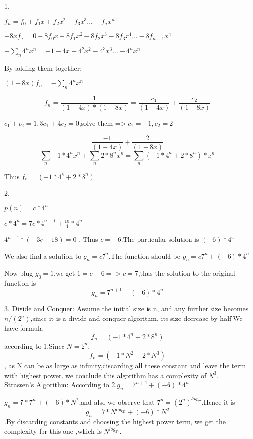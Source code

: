 \documentclass{article}
\begin{document}
1.

$f_n = f_0+f_1x+f_2x^2+f_3x^3...+f_nx^n$

$-8xf_n = 0-8f_0x-8f_1x^2-8f_2x^3-8f_3x^4...-8f_{n-1}x^n$

$-\sum_n4^nx^n=-1-4x-4^2x^2-4^3x^3...-4^nx^n$

By adding them together:

$(1-8x)f_n = -\sum_n4^nx^n$

$$f_n = \frac{1}{{(1-4x)}*{(1-8x)}} = \frac{c_1}{(1-4x)}+\frac{c_2}{(1-8x)}$$

$c_1+c_2=1,8c_1+4c_2=0$,solve them => $c_1=-1,c_2=2$

$$\frac{-1}{(1-4x)}+\frac{2}{(1-8x)}$$
$$\sum_n{-1*4^n}x^n+\sum_n2*8^nx^n=\sum_n{(-1*4^n+2*8^n)}*x^n$$

Thus $f_n =(-1*4^n+2*8^n)$ 

2.

$p(n)=c*4^n$

$c*4^n=7c*4^{n-1}+\frac{18}{4}*4^n$

$4^{n-1}*(-3c-18)=0$ . Thus $c = - 6$.The particular solution is $(-6)*4^n$

We also find a solution to $g_n=c7^n$.The function should be $g_n=c7^n+(-6)*4^n$

Now plug  $g_0=1$,we get $1=c-6 => c = 7$,thus the solution to the original function is $$g_n=7^{n+1}+(-6)*4^n$$

3.
Divide and Conquer:
Assume the initial size is n, and any further size becomes $n/(2^n)$,since it is a divide and conquer algorithm, its size decrease by half.We have formula $$f_n = (-1*4^n+2*8^n)$$ according to 1.Since $N=2^n$,$$f_n = (-1*N^2+2*N^3)$$, as N can be as large as infinity,discarding all these constant and leave the term with highest power, we conclude this algorithm has a complexity of $N^3$.\\

Strassen’s Algorithm:
According to 2.$g_n=7^{n+1}+(-6)*4^n$ 

$g_n=7*7^n+(-6)*N^2$,and also we observe that $7^n = (2^n)^{log_27}$.Hence it is $$g_n=7*N^{log_27}+(-6)*N^2$$.By discarding constants and choosing the highest power term, we get the complexity for this one ,which is $N^{log_27}$.
\end{document}

